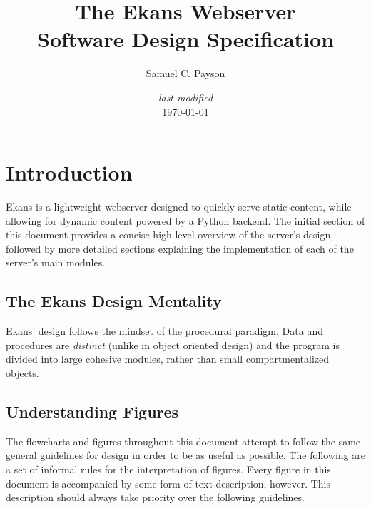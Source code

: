 \documentclass[11pt]{article}
\title{The Ekans Webserver \\ {\small\textbf{Software Design Specification}}}
\author {Samuel C. Payson}
\date{{\footnotesize \emph{last modified\\}}\today}
\begin{document}
\maketitle
\thispagestyle{empty}
\pagebreak
\pagestyle{fancy}
\setcounter{page}{1}
\tableofcontents
\pagebreak
\setcounter{page}{1}
\section{Introduction}
Ekans is a lightweight webserver designed to quickly serve static content, while allowing for dynamic content powered by a Python backend. The initial section of this document provides a concise high-level overview of the server's design, followed by more detailed sections explaining the implementation of each of the server's main modules.
\subsection{The Ekans Design Mentality}
Ekans' design follows the mindset of the procedural paradigm. Data and procedures are \emph{distinct} (unlike in object oriented design) and the program is divided into large cohesive modules, rather than small compartmentalized objects.

\subsection{Understanding Figures}
The flowcharts and figures throughout this document attempt to follow the same general guidelines for design in order to be as useful as possible. The following are a set of informal rules for the interpretation of figures. Every figure in this document is accompanied by some form of text description, however. This description should always take priority over the following guidelines.
\end{document}
